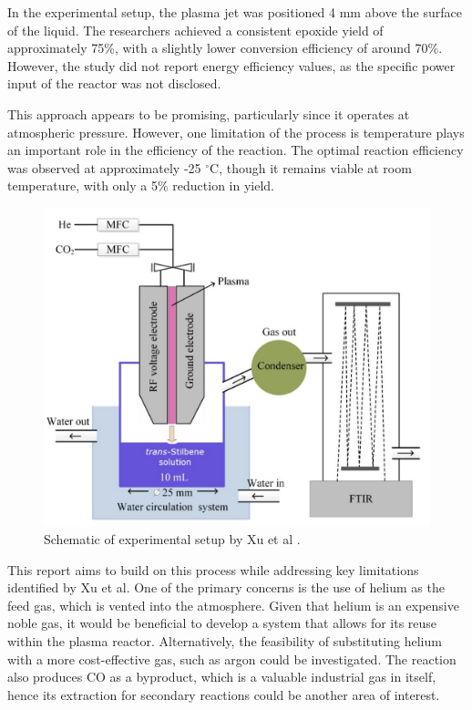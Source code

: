 In the experimental setup, the plasma jet was positioned 4 mm above the surface of the liquid. The researchers achieved a consistent epoxide yield of approximately 75\%, with a slightly lower conversion efficiency of around 70\%. However, the study did not report energy efficiency values, as the specific power input of the reactor was not disclosed.

This approach appears to be promising, particularly since it operates at atmospheric pressure. However, one limitation of the process is temperature plays an important role in the efficiency of the reaction. The optimal reaction efficiency was observed at approximately -25 $^\circ$C, though it remains viable at room temperature, with only a 5\% reduction in yield.

\begin{figure}[h!]
	\centering
	\includegraphics[width=0.75\linewidth]{chapter_3/figures/han_epoxidation_setup.png}
	\caption{Schematic of experimental setup by Xu et al \cite{Xu2021}.}
	\label{fig:han_epoxidation_setup}
\end{figure}

This report aims to build on this process while addressing key limitations identified by Xu et al. One of the primary concerns is the use of helium as the feed gas, which is vented into the atmosphere. Given that helium is an expensive noble gas, it would be beneficial to develop a system that allows for its reuse within the plasma reactor. Alternatively, the feasibility of substituting helium with a more cost-effective gas, such as argon could be investigated. The reaction also produces CO as a byproduct, which is a valuable industrial gas in itself, hence its extraction for secondary reactions could be another area of interest.

